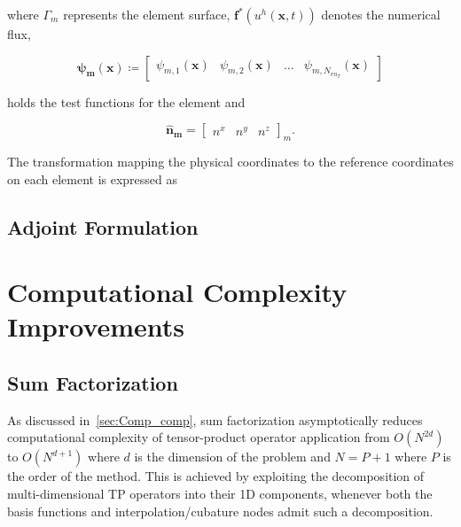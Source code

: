 \documentclass[12pt,Bold,letterpaper,TexShade]{mcgilletdclass}
\numberwithin{equation}{section}
\newcommand{\vect}[1]{\bm{{#1}}}
\begin{document}
where $\Gamma_m$ represents the element surface, $\vect{f^*}(u^h(\vect{x},t))$ denotes the numerical flux,

\begin{equation*}
\vect{\psi_{m}}(\vect{x}) \coloneqq
\begin{bmatrix} 
\psi_{m,1}(\vect{x}) & \psi_{m,2}(\vect{x}) & \dots & \psi_{m,N_{vn_T}}(\vect{x})
\end{bmatrix}
\end{equation*}

holds the test functions for the element and

\begin{equation*}
\vect{\hat{n}_m} = 
\begin{bmatrix} 
n^x & n^y & n^z
\end{bmatrix}_m.
\end{equation*}

The transformation mapping the physical coordinates to the reference coordinates on each element is expressed as

\section{Adjoint Formulation}



\chapter{Computational Complexity Improvements}

\section{Sum Factorization}

As discussed in~\autoref{sec:Comp_comp}, sum factorization asymptotically reduces computational complexity of tensor-product operator application from $O(N^{2d})$ to $O(N^{d+1})$ where $d$ is the dimension of the problem and $N = P+1$ where $P$ is the order of the method. This is achieved by exploiting the decomposition of multi-dimensional TP operators into their 1D components, whenever both the basis functions and interpolation/cubature nodes admit such a decomposition. 

\end{document}
